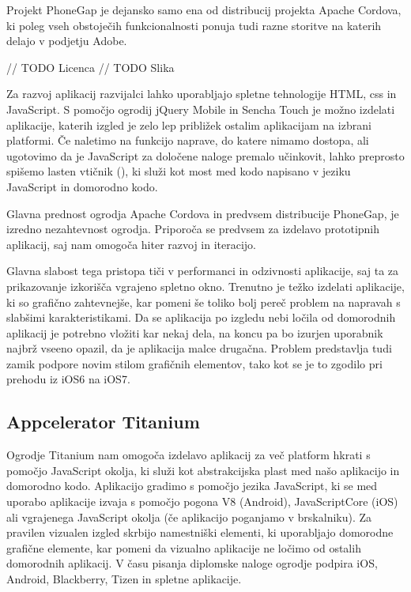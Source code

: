 Projekt PhoneGap\cite{phonegap} je dejansko samo ena od distribucij projekta Apache Cordova, ki poleg vseh obstoječih funkcionalnosti ponuja tudi razne storitve na katerih delajo v podjetju Adobe.

// TODO Licenca
// TODO Slika

Za razvoj aplikacij razvijalci lahko uporabljajo spletne tehnologije HTML, \gls{css} in JavaScript. S pomočjo ogrodij jQuery Mobile\cite{jquerymobile} in Sencha Touch\cite{sencha} je možno izdelati aplikacije, katerih izgled je zelo lep približek ostalim aplikacijam na izbrani platformi. Če naletimo na funkcijo naprave, do katere nimamo dostopa, ali ugotovimo da je JavaScript za določene naloge premalo učinkovit, lahko preprosto spišemo lasten vtičnik (), ki služi kot most med kodo napisano v jeziku JavaScript in domorodno kodo.

Glavna prednost ogrodja Apache Cordova in predvsem distribucije PhoneGap, je izredno nezahtevnost ogrodja. Priporoča se predvsem za izdelavo prototipnih aplikacij, saj nam omogoča hiter razvoj in iteracijo.

Glavna slabost tega pristopa tiči v performanci in odzivnosti aplikacije, saj ta za prikazovanje izkorišča vgrajeno spletno okno. Trenutno je težko izdelati aplikacije, ki so grafično zahtevnejše, kar pomeni še toliko bolj pereč problem na napravah s slabšimi karakteristikami. Da se aplikacija po izgledu nebi ločila od domorodnih aplikacij je potrebno vložiti kar nekaj dela, na koncu pa bo izurjen uporabnik najbrž vseeno opazil, da je aplikacija malce drugačna. Problem predstavlja tudi zamik podpore novim stilom grafičnih elementov, tako kot se je to zgodilo pri prehodu iz iOS6 na iOS7.

\subsection{Appcelerator Titanium}

Ogrodje Titanium\cite{titanium} nam omogoča izdelavo aplikacij za več platform hkrati s pomočjo JavaScript okolja, ki služi kot abstrakcijska plast med našo aplikacijo in domorodno kodo. Aplikacijo gradimo s pomočjo jezika JavaScript, ki se med uporabo aplikacije izvaja s pomočjo pogona V8\cite{v8} (Android), JavaScriptCore (iOS)\cite{javascriptcore} ali vgrajenega JavaScript okolja (če aplikacijo poganjamo v brskalniku). Za pravilen vizualen izgled skrbijo namestniški elementi, ki uporabljajo domorodne grafične elemente, kar pomeni da vizualno aplikacije ne ločimo od ostalih domorodnih aplikacij. V času pisanja diplomske naloge ogrodje podpira iOS, Android, Blackberry, Tizen in spletne aplikacije.

